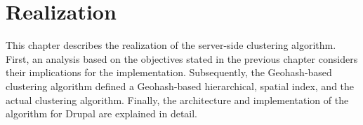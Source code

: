 
%
%

\chapter{Realization}
\label{chapter:realization}

This chapter describes the realization of the server-side clustering algorithm. First, an analysis based on the objectives stated in the previous chapter considers their implications for the implementation. Subsequently, the Geohash-based clustering algorithm defined a Geohash-based hierarchical, spatial index, and the actual clustering algorithm. Finally, the architecture and implementation of the algorithm for Drupal are explained in detail.




	
